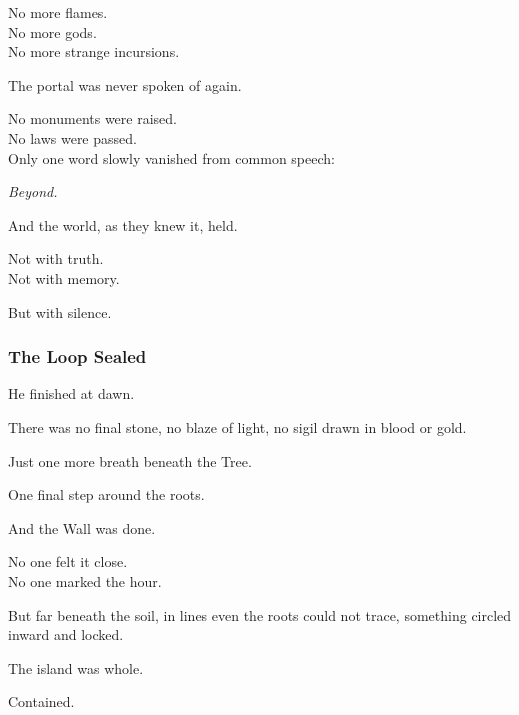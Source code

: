 \documentclass[12pt]{article}
\begin{document}
\vspace{0.5em}
No more flames.\\
No more gods.\\
No more strange incursions.

\vspace{0.5em}
The portal was never spoken of again.

\vspace{0.5em}
No monuments were raised.\\
No laws were passed.\\
Only one word slowly vanished from common speech:

\vspace{0.5em}
\textit{Beyond.}

\vspace{0.5em}
And the world, as they knew it, held.

\vspace{0.5em}
Not with truth.\\
Not with memory.

\vspace{0.5em}
But with silence.

\dotfill

\subsubsection*{The Loop Sealed}

He finished at dawn.

\vspace{0.5em}
There was no final stone, no blaze of light, no sigil drawn in blood or gold.

\vspace{0.5em}
Just one more breath beneath the Tree.

\vspace{0.5em}
One final step around the roots.

\vspace{0.5em}
And the Wall was done.

\vspace{0.5em}
No one felt it close.\\
No one marked the hour.

\vspace{0.5em}
But far beneath the soil, in lines even the roots could not trace, something circled inward and locked.

\vspace{0.5em}
The island was whole.

\vspace{0.5em}
Contained.
\end{document}

